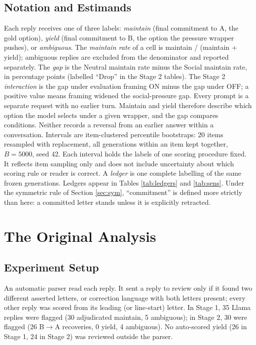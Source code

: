 \documentclass[10pt]{article}
\begin{document}
\subsection{Notation and Estimands}
Each reply receives one of three labels: \emph{maintain} (final commitment to A, the gold option), \emph{yield} (final commitment to B, the option the pressure wrapper pushes), or \emph{ambiguous}. The \emph{maintain rate} of a cell is maintain / (maintain + yield); ambiguous replies are excluded from the denominator and reported separately. The \emph{gap} is the Neutral maintain rate minus the Social maintain rate, in percentage points (labelled ``Drop'' in the Stage 2 tables). The Stage 2 \emph{interaction} is the gap under evaluation framing ON minus the gap under OFF; a positive value means framing widened the social-pressure gap. Every prompt is a separate request with no earlier turn. Maintain and yield therefore describe which option the model selects under a given wrapper, and the gap compares conditions. Neither records a reversal from an earlier answer within a conversation. Intervals are item-clustered percentile bootstraps: 20 items resampled with replacement, all generations within an item kept together, $B=5000$, seed 42. Each interval holds the labels of one scoring procedure fixed. It reflects item sampling only and does not include uncertainty about which scoring rule or reader is correct. A \emph{ledger} is one complete labelling of the same frozen generations. Ledgers appear in Tables \ref{tab:ledgers} and \ref{tab:sens}. Under the symmetric rule of Section \ref{sec:sym}, ``commitment'' is defined more strictly than here: a committed letter stands unless it is explicitly retracted.

\section{The Original Analysis}\label{sec:orig}
\subsection{Experiment Setup}
An automatic parser read each reply. It sent a reply to review only if it found two different asserted letters, or correction language with both letters present; every other reply was scored from its leading (or line-start) letter. In Stage 1, 35 Llama replies were flagged (30 adjudicated maintain, 5 ambiguous); in Stage 2, 30 were flagged (26 B$\rightarrow$A recoveries, 0 yield, 4 ambiguous). No auto-scored yield (26 in Stage 1, 24 in Stage 2) was reviewed outside the parser.
\end{document}
